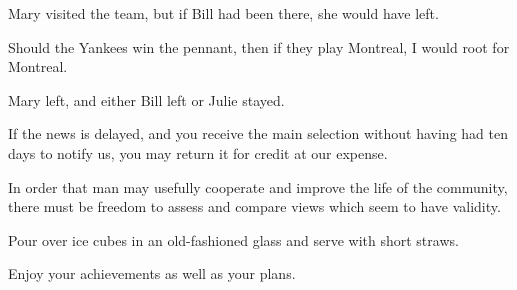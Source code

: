 \begin{enumerate}
\begin{statement}{Mary visited the team, but if Bill had been there, she would have left.}
\end{statement}

\begin{statement}{Should the Yankees win the pennant, then if they play Montreal, I would root for Montreal.}
\end{statement}

\begin{statement}{Mary left, and either Bill left or Julie stayed.}
\end{statement}

\begin{statement}{If the news is delayed, and you receive the main selection without having had ten days to notify us, you may return it for credit at our expense.}
\end{statement}

\begin{statement}{In order that man may usefully cooperate and improve the life of the community, there must be freedom to assess and compare views which seem to have validity.}
\end{statement}

\begin{statement}{Pour over ice cubes in an old-fashioned glass and serve with short straws.}
\end{statement}

\begin{statement}{Enjoy your achievements as well as your plans.}
\end{statement}


\end{enumerate}
